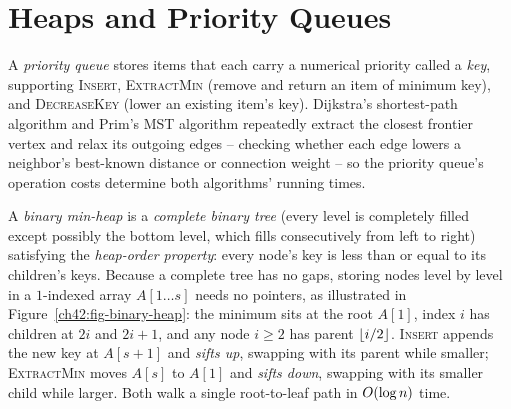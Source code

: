 \section{Heaps and Priority Queues}
\label{ch42:heaps}

A \emph{priority queue} stores items that each carry a numerical priority called a \emph{key}, supporting \textsc{Insert}, \textsc{ExtractMin} (remove and return an item of minimum key), and \textsc{DecreaseKey} (lower an existing item's key). Dijkstra's shortest-path algorithm and Prim's MST algorithm repeatedly extract the closest frontier vertex and relax its outgoing edges -- checking whether each edge lowers a neighbor's best-known distance or connection weight -- so the priority queue's operation costs determine both algorithms' running times.

\begin{intuitionbox}
A \emph{binary min-heap} is a \emph{complete binary tree} (every level is completely filled except possibly the bottom level, which fills consecutively from left to right) satisfying the \emph{heap-order property}: every node's key is less than or equal to its children's keys. Because a complete tree has no gaps, storing nodes level by level in a $1$-indexed array $A[1\dots s]$ needs no pointers, as illustrated in Figure~\ref{ch42:fig-binary-heap}: the minimum sits at the root $A[1]$, index $i$ has children at $2i$ and $2i+1$, and any node $i \ge 2$ has parent $\lfloor i/2\rfloor$. \textsc{Insert} appends the new key at $A[s+1]$ and \emph{sifts up}, swapping with its parent while smaller; \textsc{ExtractMin} moves $A[s]$ to $A[1]$ and \emph{sifts down}, swapping with its smaller child while larger. Both walk a single root-to-leaf path in $O(\log n)$ time.
\end{intuitionbox}

